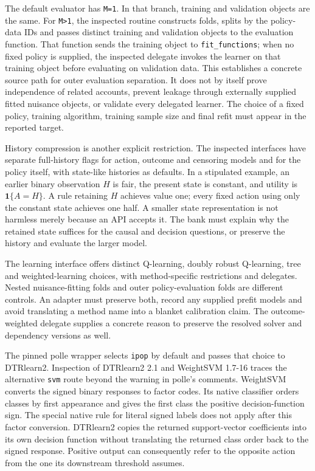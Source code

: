 The default evaluator has \texttt{M=1}. In that branch, training and validation
objects are the same. For \texttt{M>1}, the inspected routine constructs folds,
splits by the policy-data IDs and passes distinct training and validation objects
to the evaluation function. That function sends the training object to
\texttt{fit\_functions}; when no fixed policy is supplied, the inspected delegate
invokes the learner on that training object before evaluating on validation data.
This establishes a concrete source path for outer evaluation separation. It does
not by itself prove independence of related accounts, prevent leakage through
externally supplied fitted nuisance objects, or validate every delegated learner.
The choice of a fixed policy, training algorithm, training sample size and final
refit must appear in the reported target.~\citep{exec24_policiesr_polle}

History compression is another explicit restriction. The inspected interfaces have
separate full-history flags for action, outcome and censoring models and for the
policy itself, with state-like histories as defaults. In a stipulated example,
an earlier binary observation $H$ is fair, the present state is constant, and utility
is $\mathbf1\{A=H\}$. A rule retaining $H$ achieves value one; every fixed action
using only the constant state achieves one half. A smaller state representation is
not harmless merely because an API accepts it. The bank must explain why the
retained state suffices for the causal and decision questions, or preserve the
history and evaluate the larger model.~\citep{exec24_policiesr_polle,exec24_policiesr_reference}

The learning interface offers distinct Q-learning, doubly robust Q-learning, tree
and weighted-learning choices, with method-specific restrictions and delegates.
Nested nuisance-fitting folds and outer policy-evaluation folds are different
controls. An adapter must preserve both, record any supplied prefit models and
avoid translating a method name into a blanket calibration claim. The
outcome-weighted delegate supplies a concrete reason to preserve the resolved
solver and dependency versions as well.~\citep{exec24_policiesr_polle}

The pinned polle wrapper selects \texttt{ipop} by default and passes that
choice to DTRlearn2. Inspection of DTRlearn2 2.1 and WeightSVM 1.7-16
traces the alternative \texttt{svm} route beyond the warning in polle's
comments. WeightSVM converts the signed binary responses to factor codes.
Its native classifier orders classes by first appearance and gives the
first class the positive decision-function sign. The special native rule
for literal signed labels does not apply after this factor conversion.
DTRlearn2 copies the returned support-vector coefficients into its own
decision function without translating the returned class order back to the
signed response. Positive output can consequently refer to the opposite
action from the one its downstream threshold assumes.
\citep{rel15policydelegates}

